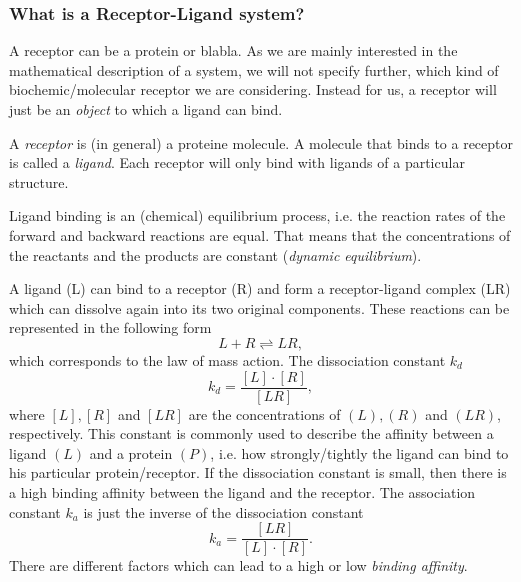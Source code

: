 \subsubsection*{What is a Receptor-Ligand system?}

A receptor can be a protein or blabla. As we are mainly interested in the mathematical description of a system, we will not specify further, which kind of biochemic/molecular receptor we are considering. Instead for us, a receptor will just be an \textit{object} to which a ligand can bind.

A \textit{receptor} is (in general) a proteine molecule.
A molecule that binds to a receptor is called a \textit{ligand}.
Each receptor will only bind with ligands of a particular structure.

Ligand binding is an (chemical) equilibrium process, i.e. the reaction rates of the forward and backward reactions are equal. That means that the concentrations of the reactants and the products are constant
(\textit{dynamic equilibrium}). 

A ligand (L) can bind to a receptor (R) and form a receptor-ligand complex (LR) which can dissolve again into its two original components. These reactions can be represented in the following form
\begin{equation*}
\label{eq:reaction}
L + R \rightleftharpoons LR,
\end{equation*}
which corresponds to the law of mass action. 
The dissociation constant $k_d$
\begin{equation*}
k_d = \frac{[L] \cdot [R]}{[LR]},
\end{equation*}
where $[L], [R]$ and $[LR]$ are the concentrations of $(L),(R)$ and $(LR)$, respectively. This constant is commonly used to describe the affinity between a ligand $(L)$ and a protein $(P)$, i.e. how strongly/tightly the ligand can bind to his particular protein/receptor. If the dissociation constant is small, then there is a high binding affinity between the ligand and the receptor.
The association constant $k_a$ is just the inverse of the dissociation constant
\begin{equation*}
k_a = \frac{[LR]}{[L] \cdot [R]}.
\end{equation*}
There are different factors which can lead to a high or low \textit{binding affinity}. 

